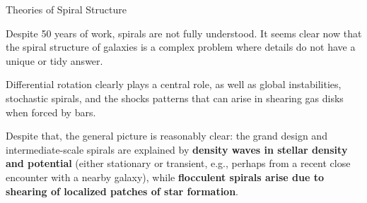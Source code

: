 \documentclass[letterpaper,landscape]{slides}
\begin{document}
\begin{slide}

\begin{center}
{\large \color{red} 
                 Theories of Spiral Structure }
\end{center}

Despite 50 years of work, spirals are not fully understood. It
seems clear now that the spiral structure of galaxies is a complex
problem where details do not have a unique or tidy answer.

Differential rotation clearly plays a central role, as well as global
instabilities, stochastic spirals, and the shocks patterns that can
arise in shearing gas disks when forced by bars.

Despite that, the general picture is reasonably clear: the grand
design and intermediate-scale spirals are explained by {\bf density
waves in stellar density and potential} (either stationary or 
transient, e.g., perhaps from a recent close encounter with a nearby
galaxy), while {\bf flocculent spirals arise due to shearing of
localized patches of star formation}.

\vfill
\end{slide}


\begin{slide}

\begin{center}
\vskip -0.4in
\end{center}

\end{slide}
\end{document}
